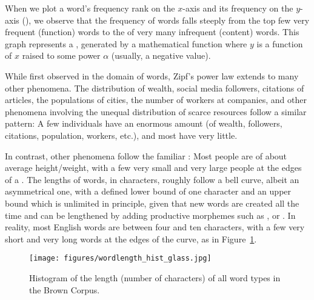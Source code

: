 When we plot a word's frequency rank on the $x$-axis and its frequency
on the $y$-axis (), we observe that the frequency of words falls steeply
from the top few very frequent (function) words to the  of very many infrequent (content) words.  This graph represents
a , generated by a mathematical
function where $y$ is a function of $x$ raised to some power $\alpha$
(usually, a negative value). 

While first observed in the domain of words, Zipf's power law extends
to many other phenomena.  The distribution of wealth, social media
followers, citations of articles, the populations of cities, the
number of workers at companies, and other phenomena involving the
unequal distribution of scarce resources follow a similar pattern: A
few individuals have an enormous amount (of wealth, followers,
citations, population, workers, etc.), and most have very little.

In contrast, other phenomena follow the familiar : Most people are of about average height/weight, with a
few very small and very large people at the edges of a .  The lengths of words, in characters, roughly follow a bell
curve, albeit an asymmetrical one, with a defined lower bound of one
character and an upper bound which is unlimited in principle, given
that new words are created all the time and can be lengthened by
adding productive morphemes such as , or
.  In reality, most English words are between four and
ten characters, with a few very short and very long words at the edges
of the curve, as in Figure~\ref{fig:wordlength}.

\begin{figure}[htbp]
\centering
  \texttt{[image: figures/wordlength\_hist\_glass.jpg]}
  \caption{Histogram of the length (number of characters) of all word types in the Brown Corpus.}
  \label{fig:wordlength}
  \end{figure}
  
